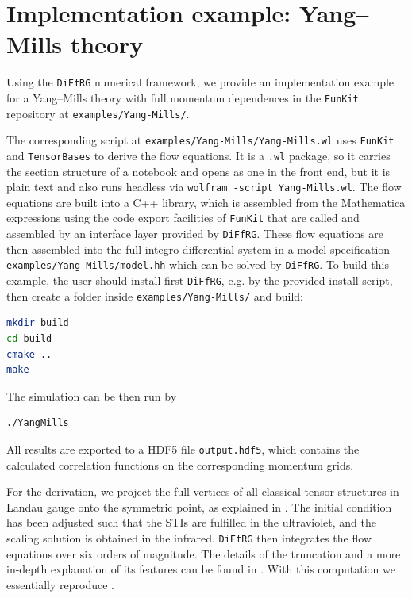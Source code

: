\documentclass[preprint,10pt,sort&compress]{elsarticle}
\newcommand{\FunKit}{\texttt{FunKit}\xspace}
\newcommand{\TensorBases}{\texttt{TensorBases}\xspace}
\newcommand{\DiFfRG}{\texttt{DiFfRG}\xspace}
\begin{document}
\section{Implementation example: Yang--Mills theory}
\label{sec:YMExample}

Using the \DiFfRG \cite{Sattler:2024ozv} numerical framework, we provide an implementation example for a Yang--Mills theory with full momentum dependences in the \FunKit repository \cite{FunKitRepo} at \texttt{examples/Yang-Mills/}.

The corresponding script at \texttt{examples/Yang-Mills/Yang-Mills.wl} uses \FunKit and \TensorBases to derive the flow equations. It is a \texttt{.wl} package, so it carries the section structure of a notebook and opens as one in the front end, but it is plain text and also runs headless via \texttt{wolfram -script Yang-Mills.wl}.
The flow equations are built into a C++ library, which is assembled from the Mathematica expressions using the code export facilities of \FunKit that are called and assembled by an interface layer provided by \DiFfRG.
These flow equations are then assembled into the full integro-differential system in a model specification \texttt{examples/Yang-Mills/model.hh} which can be solved by \DiFfRG. To build this example, the user should install first \DiFfRG, e.g. by the provided install script, then create a folder inside \texttt{examples/Yang-Mills/} and build:
%
\begin{lstlisting}[language=Bash]
mkdir build
cd build
cmake ..
make
\end{lstlisting}
%
The simulation can be then run by
%
\begin{lstlisting}[language=Bash]
./YangMills
\end{lstlisting}
%
All results are exported to a HDF5 file \texttt{output.hdf5}, which contains the calculated correlation functions on the corresponding momentum grids.

For the derivation, we project the full vertices of all classical tensor structures in Landau gauge onto the symmetric point, as explained in . 
The initial condition has been adjusted such that the STIs are fulfilled in the ultraviolet, and the scaling solution is obtained in the infrared. \DiFfRG then integrates the flow equations over six orders of magnitude.
The details of the truncation and a more in-depth explanation of its features can be found in \cite{Cyrol:2016tym}. With this computation we essentially reproduce \cite{Cyrol:2016tym}.
\end{document}
